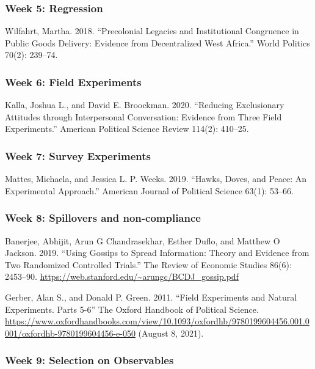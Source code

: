 \documentclass[
  11pt,
]{article}
\begin{document}
\hypertarget{week-5-regression}{%
\subsubsection{Week 5: Regression}\label{week-5-regression}}

Wilfahrt, Martha. 2018. ``Precolonial Legacies and Institutional
Congruence in Public Goods Delivery: Evidence from Decentralized West
Africa.'' World Politics 70(2): 239--74.

\hypertarget{week-6-field-experiments}{%
\subsubsection{Week 6: Field
Experiments}\label{week-6-field-experiments}}

Kalla, Joshua L., and David E. Broockman. 2020. ``Reducing Exclusionary
Attitudes through Interpersonal Conversation: Evidence from Three Field
Experiments.'' American Political Science Review 114(2): 410--25.

\hypertarget{week-7-survey-experiments}{%
\subsubsection{Week 7: Survey
Experiments}\label{week-7-survey-experiments}}

Mattes, Michaela, and Jessica L. P. Weeks. 2019. ``Hawks, Doves, and
Peace: An Experimental Approach.'' American Journal of Political Science
63(1): 53--66.

\hypertarget{week-8-spillovers-and-non-compliance}{%
\subsubsection{Week 8: Spillovers and
non-compliance}\label{week-8-spillovers-and-non-compliance}}

Banerjee, Abhijit, Arun G Chandrasekhar, Esther Duflo, and Matthew O
Jackson. 2019. ``Using Gossips to Spread Information: Theory and
Evidence from Two Randomized Controlled Trials.'' The Review of Economic
Studies 86(6): 2453--90.
\url{https://web.stanford.edu/~arungc/BCDJ_gossip.pdf}

Gerber, Alan S., and Donald P. Green. 2011. ``Field Experiments and
Natural Experiments. Parts 5-6'' The Oxford Handbook of Political
Science.
\url{https://www.oxfordhandbooks.com/view/10.1093/oxfordhb/9780199604456.001.0001/oxfordhb-9780199604456-e-050}
(August 8, 2021).

\hypertarget{week-9-selection-on-observables}{%
\subsubsection{Week 9: Selection on
Observables}\label{week-9-selection-on-observables}}
\end{document}
